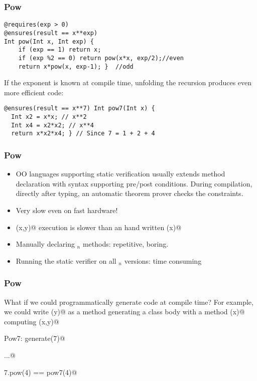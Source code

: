 
\begin{frame}[fragile]
\frametitle{Pow}

\begin{lstlisting}
@requires(exp > 0)
@ensures(result == x**exp)
Int pow(Int x, Int exp) {
	if (exp == 1) return x;
	if (exp %2 == 0) return pow(x*x, exp/2);//even
	return x*pow(x, exp-1); }  //odd
\end{lstlisting}
If the exponent is known at compile time,
unfolding the recursion produces even more efficient code:
\vspace{-1ex}
\begin{lstlisting}
@ensures(result == x**7) Int pow7(Int x) { 
  Int x2 = x*x; // x**2
  Int x4 = x2*x2; // x**4
  return x*x2*x4; } // Since 7 = 1 + 2 + 4
\end{lstlisting}

\end{frame}


\begin{frame}[fragile]
\frametitle{Pow}
\begin{itemize}
\item OO languages supporting static verification usually extends method
declaration with syntax supporting pre/post conditions. During
compilation, directly after typing, an automatic theorem prover
checks the constraints.
\item Very slow even on fast hardware!
\item \Q@pox(x,y)@ execution is slower than an hand written (x)@
\item Manually declaring \Q@pow@$_n$ methods: repetitive, boring.
\item Running the static verifier on all \Q@pow@$_n$ versions: time consuming
\end{itemize}
\end{frame}


\begin{frame}[fragile]
\frametitle{Pow}

What if we could programmatically generate code at compile time?
For example, we could write \Q@generate(y)@ as a method
generating a class body with a method \Q@pow(x)@ computing
\Q@pow(x,y)@

\Q@class Pow7: generate(7)@

\Q@...@

\Q@Pow7.pow(4) == pow7(4)@

\end{frame}


